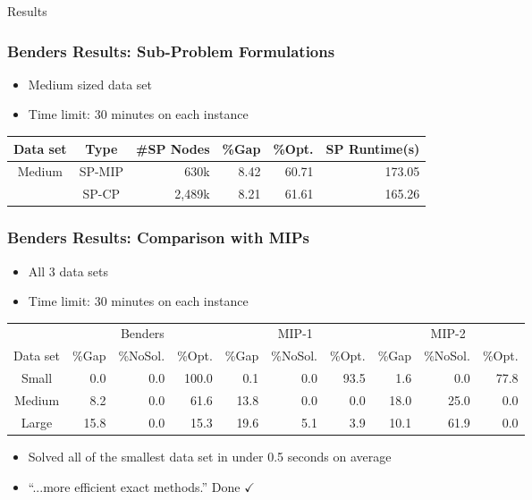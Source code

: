 \documentclass{beamer}
\begin{document}
\begin{frame}
\Huge{\centerline{Results}}
\end{frame}

\begin{frame}
\frametitle{Benders Results: Sub-Problem Formulations}
\begin{itemize}
	\item Medium sized data set\vspace{1mm}
	\item Time limit: 30 minutes on each instance
\end{itemize}
\begin{table}
	\centering
	\begin{tabular}{ccrrrr}
		\toprule
		Data set & Type & \#SP Nodes & \%Gap & \%Opt. & SP Runtime(s) \\\midrule\midrule
		Medium & SP-MIP{} & 630k & 8.42 & 60.71 & 173.05 \\
		 & SP-CP{} & 2,489k & 8.21 & 61.61 & 165.26 \\
		\bottomrule
	\end{tabular}
\end{table}
\end{frame}

\begin{frame}
\frametitle{Benders Results: Comparison with MIPs}
\begin{itemize}
	\item All 3 data sets\vspace{1mm}
	\item Time limit: 30 minutes on each instance
\end{itemize}
\begin{table}
	\setlength{\tabcolsep}{0.2em}
	\centering
	\small
	\begin{tabular}{crrrrrrrrr}
		\toprule
		& \multicolumn{3}{c}{Benders} & \multicolumn{3}{c}{MIP-1} & \multicolumn{3}{c}{MIP-2}  \\
		 \cmidrule(lr){2-4} \cmidrule(lr){5-7} \cmidrule(lr){8-10}
		Data set & \%Gap &\%NoSol. &  \%Opt. & \%Gap & \%NoSol. & \%Opt. & \%Gap & \%NoSol. & \%Opt. \\\midrule\midrule
		Small & 0.0 & 0.0 & {\color{red} 100.0} & 0.1 & 0.0 & {\color{red} 93.5} & 1.6 & 0.0 & {\color{red} 77.8} \\
		Medium & 8.2 & 0.0 & {\color{red} 61.6} & 13.8 & 0.0 & {\color{red} 0.0} & 18.0 & 25.0 & {\color{red} 0.0} \\
		Large & 15.8 & 0.0 & {\color{red} 15.3} & 19.6 & 5.1 & {\color{red} 3.9} & 10.1 & 61.9 & {\color{red} 0.0} \\
		\bottomrule
	\end{tabular}
\end{table}\pause
\begin{itemize}
	\item Solved all of the smallest data set in under 0.5 seconds on average
	\item ``...more efficient exact methods.'' \pause Done $\checkmark$
\end{itemize}
\end{frame}
\end{document}
